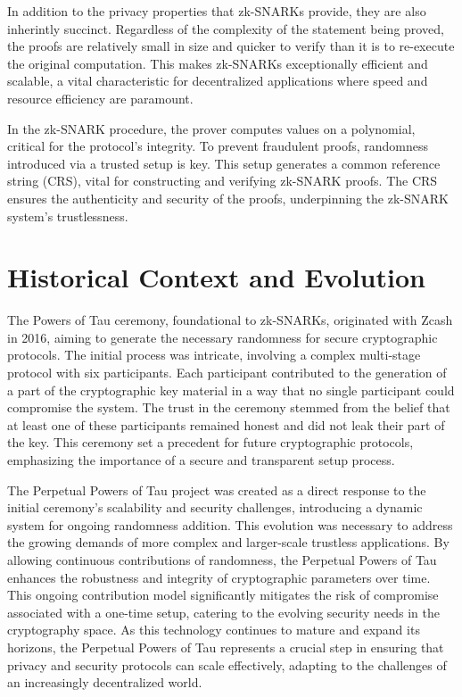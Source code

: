 \documentclass[11pt]{article}
\begin{document}
In addition to the privacy properties that zk-SNARKs provide, they are also inherintly succinct. Regardless of the complexity of the statement being proved, the proofs are relatively small in size and quicker to verify than it is to re-execute the original computation. This makes zk-SNARKs exceptionally efficient and scalable, a vital characteristic for decentralized applications where speed and resource efficiency are paramount.

In the zk-SNARK procedure, the prover computes values on a polynomial, critical for the protocol's integrity. To prevent fraudulent proofs, randomness introduced via a trusted setup is key. This setup generates a common reference string (CRS), vital for constructing and verifying zk-SNARK proofs. The CRS ensures the authenticity and security of the proofs, underpinning the zk-SNARK system's trustlessness.
\section{Historical Context and Evolution}
\label{sec:org1b5c506}

The Powers of Tau ceremony, foundational to zk-SNARKs, originated with Zcash in 2016, aiming to generate the necessary randomness for secure cryptographic protocols. The initial process was intricate, involving a complex multi-stage protocol with six participants. Each participant contributed to the generation of a part of the cryptographic key material in a way that no single participant could compromise the system. The trust in the ceremony stemmed from the belief that at least one of these participants remained honest and did not leak their part of the key. This ceremony set a precedent for future cryptographic protocols, emphasizing the importance of a secure and transparent setup process.

The Perpetual Powers of Tau project was created as a direct response to the initial ceremony's scalability and security challenges, introducing a dynamic system for ongoing randomness addition. This evolution was necessary to address the growing demands of more complex and larger-scale trustless applications. By allowing continuous contributions of randomness, the Perpetual Powers of Tau enhances the robustness and integrity of cryptographic parameters over time. This ongoing contribution model significantly mitigates the risk of compromise associated with a one-time setup, catering to the evolving security needs in the cryptography space. As this technology continues to mature and expand its horizons, the Perpetual Powers of Tau represents a crucial step in ensuring that privacy and security protocols can scale effectively, adapting to the challenges of an increasingly decentralized world.
\end{document}
